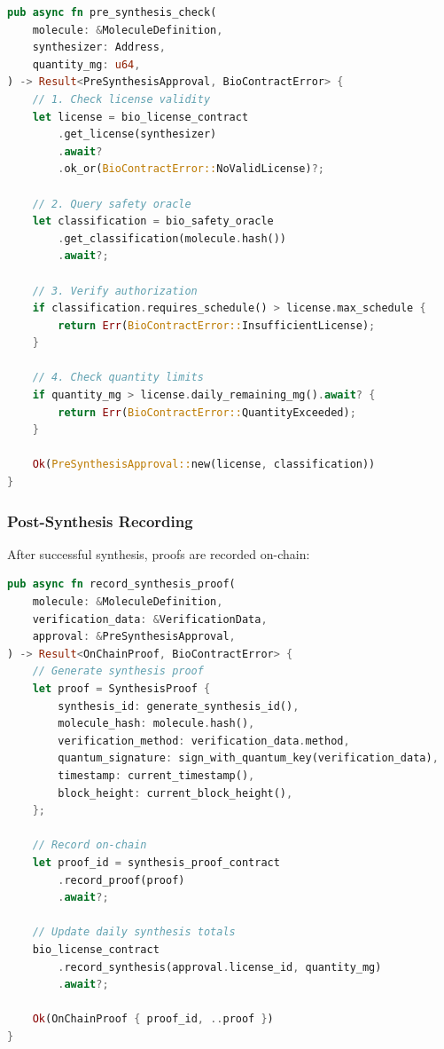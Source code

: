 \documentclass[12pt,a4paper]{article}
\begin{document}
\begin{lstlisting}[language=Rust,caption={Pre-synthesis blockchain check}]
pub async fn pre_synthesis_check(
    molecule: &MoleculeDefinition,
    synthesizer: Address,
    quantity_mg: u64,
) -> Result<PreSynthesisApproval, BioContractError> {
    // 1. Check license validity
    let license = bio_license_contract
        .get_license(synthesizer)
        .await?
        .ok_or(BioContractError::NoValidLicense)?;

    // 2. Query safety oracle
    let classification = bio_safety_oracle
        .get_classification(molecule.hash())
        .await?;

    // 3. Verify authorization
    if classification.requires_schedule() > license.max_schedule {
        return Err(BioContractError::InsufficientLicense);
    }

    // 4. Check quantity limits
    if quantity_mg > license.daily_remaining_mg().await? {
        return Err(BioContractError::QuantityExceeded);
    }

    Ok(PreSynthesisApproval::new(license, classification))
}
\end{lstlisting}

\subsubsection{Post-Synthesis Recording}

After successful synthesis, proofs are recorded on-chain:

\begin{lstlisting}[language=Rust,caption={Post-synthesis proof recording}]
pub async fn record_synthesis_proof(
    molecule: &MoleculeDefinition,
    verification_data: &VerificationData,
    approval: &PreSynthesisApproval,
) -> Result<OnChainProof, BioContractError> {
    // Generate synthesis proof
    let proof = SynthesisProof {
        synthesis_id: generate_synthesis_id(),
        molecule_hash: molecule.hash(),
        verification_method: verification_data.method,
        quantum_signature: sign_with_quantum_key(verification_data),
        timestamp: current_timestamp(),
        block_height: current_block_height(),
    };

    // Record on-chain
    let proof_id = synthesis_proof_contract
        .record_proof(proof)
        .await?;

    // Update daily synthesis totals
    bio_license_contract
        .record_synthesis(approval.license_id, quantity_mg)
        .await?;

    Ok(OnChainProof { proof_id, ..proof })
}
\end{lstlisting}
\end{document}
